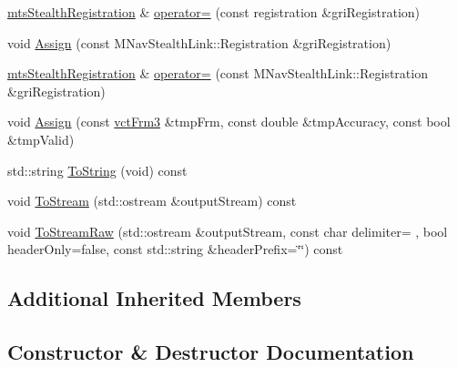 \begin{DoxyCompactItemize}
\item 
\hyperlink{classmts_stealth_registration}{mts\+Stealth\+Registration} \& \hyperlink{classmts_stealth_registration_ad2750b56f0c2164e6537f2bc54215366}{operator=} (const registration \&gri\+Registration)
\item 
void \hyperlink{classmts_stealth_registration_a947218de69c47685ed23fd9d33f9211b}{Assign} (const M\+Nav\+Stealth\+Link\+::\+Registration \&gri\+Registration)
\item 
\hyperlink{classmts_stealth_registration}{mts\+Stealth\+Registration} \& \hyperlink{classmts_stealth_registration_a40b55f90ec7cffe938e238b9a35b1b03}{operator=} (const M\+Nav\+Stealth\+Link\+::\+Registration \&gri\+Registration)
\item 
void \hyperlink{classmts_stealth_registration_add68c38da3f107b0a49ed3995b817612}{Assign} (const \hyperlink{vct_transformation_types_8h_a81feda0a02c2d1bc26e5553f409fed20}{vct\+Frm3} \&tmp\+Frm, const double \&tmp\+Accuracy, const bool \&tmp\+Valid)
\item 
std\+::string \hyperlink{classmts_stealth_registration_a215e104863a987ea4253519864c2b65d}{To\+String} (void) const 
\item 
void \hyperlink{classmts_stealth_registration_adba3ddfdec70f8ff3212e2cd540cbcf8}{To\+Stream} (std\+::ostream \&output\+Stream) const 
\item 
void \hyperlink{classmts_stealth_registration_acd36e1ba84f6168e0b5151048765888c}{To\+Stream\+Raw} (std\+::ostream \&output\+Stream, const char delimiter= \textquotesingle{} \textquotesingle{}, bool header\+Only=false, const std\+::string \&header\+Prefix=\char`\"{}\char`\"{}) const 
\end{DoxyCompactItemize}
\subsection*{Additional Inherited Members}


\subsection{Constructor \& Destructor Documentation}
\hypertarget{classmts_stealth_registration_a81080c46af0e98d66301faf0d50df7a9}{}
